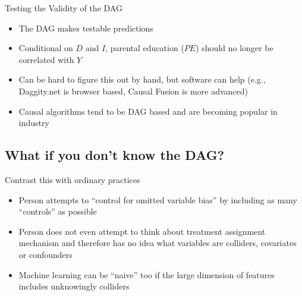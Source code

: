 \documentclass{beamer}
\begin{document}
\begin{frame}
\begin{itemize}
\begin{itemize}
          \end{itemize}
  \end{itemize}
  \framebreak


\end{frame}


\begin{frame}{Testing the Validity of the DAG}

  \begin{itemize}
    \item The DAG makes testable predictions
    \item Conditional on $D$ and $I$, parental education ($PE$) should no longer be correlated with $Y$
    \item Can be hard to figure this out by hand, but software can help (e.g., Daggity.net is browser based, Causal Fusion is more advanced)
    \item Causal algorithms tend to be DAG based and are becoming popular in industry 
  \end{itemize}

  \begin{center}
  \end{center}

\end{frame}



\subsection{What if you don't know the DAG?}

\begin{frame}{Contrast this with ordinary practices}

\begin{itemize}
\item Person attempts to ``control for omitted variable bias'' by including as many ``controls'' as possible
\item Person does not even attempt to think about treatment assignment mechanism and therefore has no idea what variables are colliders, covariates or confounders
\item Machine learning can be ``naive'' too if the large dimension of features includes unknowingly colliders
\end{itemize}

\end{frame}
\end{document}
